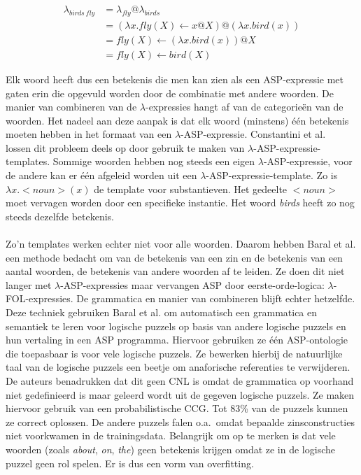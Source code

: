 \documentclass[]{article}
\theoremstyle{definition}
\begin{document}
\begin{equation}
  \begin{align*}
  \lambda_{birds\ fly} &= \lambda_{fly}@\lambda_{birds} \\
          &= (\lambda x.fly(X) \leftarrow x@X)@(\lambda x.bird(x)) \\
          &= fly(X) \leftarrow (\lambda x.bird(x))@X \\
          &= fly(X) \leftarrow bird(X)
  \label{eq:lambda}
  \end{align*}
\end{equation}

Elk woord heeft dus een betekenis die men kan zien als een ASP-expressie met gaten erin die opgevuld worden door de combinatie met andere woorden. De manier van combineren van de $\lambda$-expressies hangt af van de categorieën van de woorden. Het nadeel aan deze aanpak is dat elk woord (minstens) één betekenis moeten hebben in het formaat van een $\lambda$-ASP-expressie. Constantini et al.\ \cite{Costantini2010} lossen dit probleem deels op door gebruik te maken van $\lambda$-ASP-expressie-templates. Sommige woorden hebben nog steeds een eigen $\lambda$-ASP-expressie, voor de andere kan er één afgeleid worden uit een $\lambda$-ASP-expressie-template. Zo is $\lambda x. <noun>(x)$ de template voor substantieven. Het gedeelte $<noun>$ moet vervagen worden door een specifieke instantie. Het woord \textit{birds} heeft zo nog steeds dezelfde betekenis.

\paragraph{}Zo'n templates werken echter niet voor alle woorden. Daarom hebben Baral et al. \cite{Baral2012} een methode bedacht om van de betekenis van een zin en de betekenis van een aantal woorden, de betekenis van andere woorden af te leiden. Ze doen dit niet langer met $\lambda$-ASP-expressies maar vervangen ASP door eerste-orde-logica: $\lambda$-FOL-expressies. De grammatica en manier van combineren blijft echter hetzelfde. Deze techniek gebruiken Baral et al. \cite{Baral2012a} om automatisch een grammatica en semantiek te leren voor logische puzzels op basis van andere logische puzzels en hun vertaling in een ASP programma. Hiervoor gebruiken ze één ASP-ontologie die toepasbaar is voor vele logische puzzels. Ze bewerken hierbij de natuurlijke taal van de logische puzzels een beetje om anaforische referenties te verwijderen. De auteurs benadrukken dat dit geen CNL is omdat de grammatica op voorhand niet gedefinieerd is maar geleerd wordt uit de gegeven logische puzzels. Ze maken hiervoor gebruik van een probabilistische CCG. Tot 83\% van de puzzels kunnen ze correct oplossen. De andere puzzels falen o.a.\ omdat bepaalde zinsconstructies niet voorkwamen in de trainingsdata. Belangrijk om op te merken is dat vele woorden (zoals \textit{about}, \textit{on}, \textit{the}) geen betekenis krijgen omdat ze in de logische puzzel geen rol spelen. Er is dus een vorm van overfitting.
\end{document}
